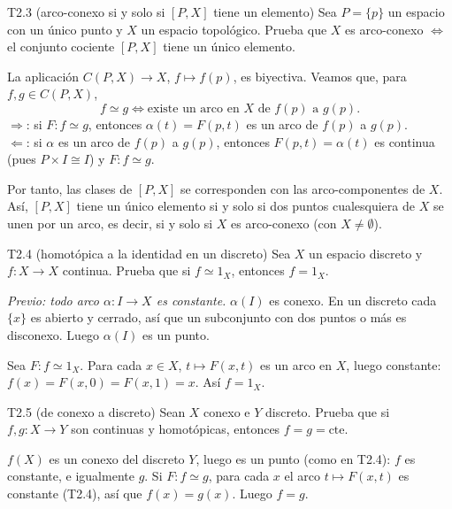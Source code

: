 \begin{ejercicio}{T2.3 (arco-conexo si y solo si $[P,X]$ tiene un elemento)}
Sea $P = \{p\}$ un espacio con un único punto y $X$ un espacio topológico. Prueba que $X$ es arco-conexo $\iff$ el conjunto cociente $[P,X]$ tiene un único elemento.

\sol \fuentepropia

La aplicación $C(P,X) \to X$, $f \mapsto f(p)$, es biyectiva. Veamos que, para $f,g \in C(P,X)$,
\[ f \simeq g \iff \text{existe un arco en } X \text{ de } f(p) \text{ a } g(p). \]
$\Rightarrow$: si $F \colon f \simeq g$, entonces $\alpha(t) = F(p,t)$ es un arco de $f(p)$ a $g(p)$.\\
$\Leftarrow$: si $\alpha$ es un arco de $f(p)$ a $g(p)$, entonces $F(p,t) = \alpha(t)$ es continua (pues $P \times I \cong I$) y $F \colon f \simeq g$.

Por tanto, las clases de $[P,X]$ se corresponden con las arco-componentes de $X$. Así, $[P,X]$ tiene un único elemento si y solo si dos puntos cualesquiera de $X$ se unen por un arco, es decir, si y solo si $X$ es arco-conexo (con $X \neq \emptyset$).
\end{ejercicio}

\begin{ejercicio}{T2.4 (homotópica a la identidad en un discreto)}
Sea $X$ un espacio discreto y $f \colon X \to X$ continua. Prueba que si $f \simeq 1_X$, entonces $f = 1_X$.

\sol \fuentepropia

\emph{Previo: todo arco $\alpha \colon I \to X$ es constante.} $\alpha(I)$ es conexo. En un discreto cada $\{x\}$ es abierto y cerrado, así que un subconjunto con dos puntos o más es disconexo. Luego $\alpha(I)$ es un punto.

Sea $F \colon f \simeq 1_X$. Para cada $x \in X$, $t \mapsto F(x,t)$ es un arco en $X$, luego constante: $f(x) = F(x,0) = F(x,1) = x$. Así $f = 1_X$.
\end{ejercicio}

\begin{ejercicio}{T2.5 (de conexo a discreto)}
Sean $X$ conexo e $Y$ discreto. Prueba que si $f, g \colon X \to Y$ son continuas y homotópicas, entonces $f = g = \text{cte}$.

\sol \fuentepropia

$f(X)$ es un conexo del discreto $Y$, luego es un punto (como en T2.4): $f$ es constante, e igualmente $g$. Si $F \colon f \simeq g$, para cada $x$ el arco $t \mapsto F(x,t)$ es constante (T2.4), así que $f(x) = g(x)$. Luego $f = g$.
\end{ejercicio}

